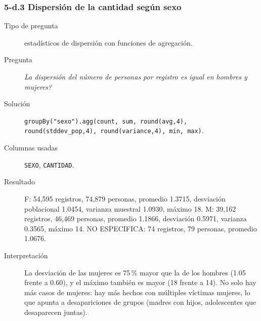 \subsubsection*{5-d.3 \textbar{} Dispersi\'on de la cantidad seg\'un sexo}
\begin{description}
\item[Tipo de pregunta] estad\'isticos de dispersi\'on con funciones de agregaci\'on.
\item[Pregunta] \emph{La dispersi\'on del n\'umero de personas por registro es igual en hombres y
      mujeres?}
\item[Soluci\'on] \texttt{groupBy("sexo").agg(count, sum, round(avg,4),
      round(stddev\_pop,4), round(variance,4), min, max)}.
\item[Columnas usadas] \texttt{SEXO}, \texttt{CANTIDAD}.
\item[Resultado] F: 54,595 registros, 74,879 personas, promedio 1.3715, desviaci\'on poblacional
      1.0454, varianza muestral 1.0930, m\'aximo 18. M: 39,162 registros, 46,469 personas,
      promedio 1.1866, desviaci\'on 0.5971, varianza 0.3565, m\'aximo 14. NO ESPECIFICA: 74
      registros, 79 personas, promedio 1.0676.
\item[Interpretaci\'on] La desviaci\'on de las mujeres es 75\,\% mayor que la de los hombres
      (1.05 frente a 0.60), y el m\'aximo tambi\'en es mayor (18 frente a 14). No solo hay m\'as
      casos de mujeres: hay m\'as hechos con m\'ultiples v\'ictimas mujeres, lo que apunta a
      desapariciones de grupos (madres con hijos, adolescentes que desaparecen juntas).
\end{description}

